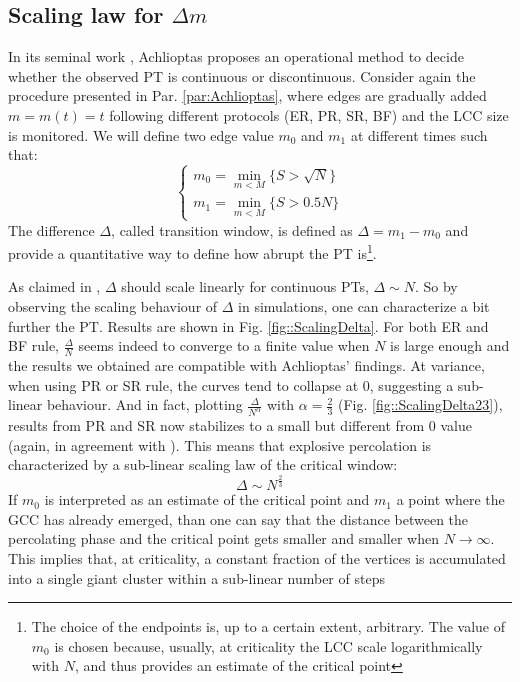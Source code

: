 \subsection{Scaling law for $\Delta m$}
\label{par:scaling}
In its seminal work \cite{Achlioptas}, Achlioptas proposes an operational method to decide whether the observed PT is continuous or discontinuous. Consider again the procedure presented in Par. \ref{par:Achlioptas}, where edges are gradually added $m = m(t) = t$ following different protocols (ER, PR, SR, BF) and the LCC size is monitored. We will define two edge value $m_0$ and $m_1$ at different times such that:
\begin{equation}
	\begin{cases}
		m_0 = \min_{m < M}\{S > \sqrt{N}\} \\
		m_1 = \min_{m < M}\{ S > 0.5 N\} 
	\end{cases}
\end{equation}
The difference $\Delta$, called transition window, is defined as $\Delta = m_1 - m_0$ and provide a quantitative way to define how abrupt the PT is\footnote{The choice of the endpoints is, up to a certain extent, arbitrary. The value of $m_0$ is chosen because, usually, at criticality the LCC scale logarithmically with $N$, and thus provides an estimate of the critical point}.  

As claimed in \cite{Achlioptas}, $\Delta$ should scale linearly for continuous PTs, $\Delta \sim N$. So by observing the scaling behaviour of $\Delta$ in simulations, one can characterize a bit further the PT. Results are shown in Fig. \ref{fig::ScalingDelta}. For both ER and BF rule, $\frac{\Delta }{N}$ seems indeed to converge to a finite value when $N$ is large enough and the results we obtained are compatible with Achlioptas' findings. At variance, when using PR or SR rule, the curves tend to collapse at $0$, suggesting a sub-linear behaviour. And in fact, plotting $\frac{\Delta}{N^{\alpha}}$ with $\alpha = \frac{2}{3}$ (Fig. \ref{fig::ScalingDelta23}), results from PR and SR now stabilizes to a small but different from $0$ value (again, in agreement with \cite{Achlioptas}). This means that explosive percolation is characterized by a sub-linear scaling law of the critical window:
$$
\Delta \sim N^{\frac{2}{3}}
$$
If $m_0$ is interpreted as an estimate of the critical point and $m_1$ a point where the GCC has already emerged, than one can say that the distance between the percolating phase and the critical point gets smaller and smaller when $N \to \infty$. 
This implies that, at criticality, a constant fraction of the vertices is accumulated into a single giant cluster within a sub-linear number of steps \cite{BOCCALETTI20161}

